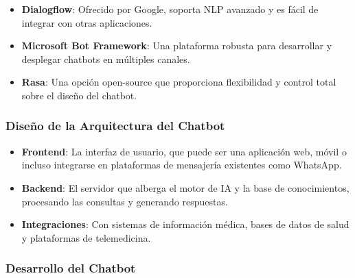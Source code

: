 \begin{itemize}
    \item \textbf{Dialogflow}: Ofrecido por Google, soporta NLP avanzado y es fácil de integrar con otras aplicaciones.
    \item \textbf{Microsoft Bot Framework}: Una plataforma robusta para desarrollar y desplegar chatbots en múltiples canales.
    \item \textbf{Rasa}: Una opción open-source que proporciona flexibilidad y control total sobre el diseño del chatbot.
\end{itemize}

\subsubsection{Diseño de la Arquitectura del Chatbot}

\begin{itemize}
    \item \textbf{Frontend}: La interfaz de usuario, que puede ser una aplicación web, móvil o incluso integrarse en plataformas de mensajería existentes como WhatsApp.
    \item \textbf{Backend}: El servidor que alberga el motor de IA y la base de conocimientos, procesando las consultas y generando respuestas.
    \item \textbf{Integraciones}: Con sistemas de información médica, bases de datos de salud y plataformas de telemedicina.
\end{itemize}

\subsubsection{Desarrollo del Chatbot}

